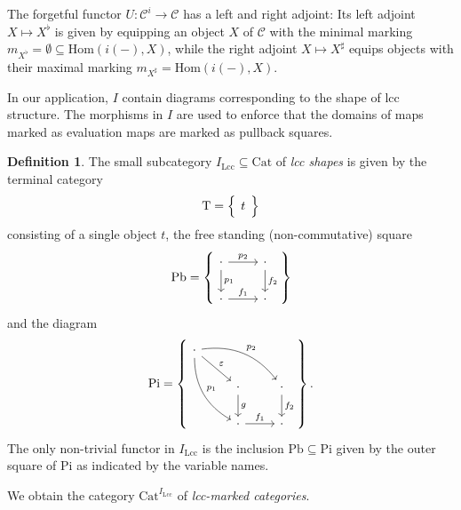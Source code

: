 \documentclass[a4paper]{article}
\theoremstyle{remark}
\theoremstyle{definition}
\newtheorem{definition}[theorem]{Definition}
\begin{document}
The forgetful functor $U : \mathcal{C}^i \rightarrow \mathcal{C}$ has a left and right adjoint:
Its left adjoint $X \mapsto X^\flat$ is given by equipping an object $X$ of $\mathcal{C}$ with the minimal marking $m_{X^\flat} = \emptyset \subseteq \mathrm{Hom}(i(-), X)$, while the right adjoint $X \mapsto X^\sharp$ equips objects with their maximal marking $m_{X^\sharp} = \mathrm{Hom}(i(-), X)$.

In our application, $I$ contain diagrams corresponding to the shape of lcc structure.
The morphisms in $I$ are used to enforce that the domains of maps marked as evaluation maps are marked as pullback squares.

\begin{definition}
  The small subcategory $I_\mathrm{Lcc} \subseteq \mathrm{Cat}$ of \emph{lcc shapes} is given by the terminal category 
  \begin{equation}
    \mathrm{T} =
    \left\{
      \begin{tikzcd}
        t
      \end{tikzcd}
    \right\}
  \end{equation}
  consisting of a single object $t$, the free standing (non-commutative) square
  \begin{equation}
    \mathrm{Pb} =
    \left\{
      \begin{tikzcd}
        \cdot \arrow[d, "p_1"] \arrow[r, "p_2"] & \cdot \arrow[d, "f_2"] \\
        \cdot \arrow[r, "f_1"] & \cdot
      \end{tikzcd}
    \right\}
  \end{equation}
  and the diagram
  \begin{equation}
    \mathrm{Pi} =
    \left\{
      \begin{tikzcd}
        \cdot \arrow[ddr, bend right, "p_1"] \arrow[drr, bend left, "p_2"] \arrow[dr, "\varepsilon"] \\
        & \cdot \arrow[d, "g"] & \cdot \arrow[d, "f_2"] \\
        & \cdot \arrow[r, "f_1"] & \cdot
      \end{tikzcd}
    \right\}.
  \end{equation}
  The only non-trivial functor in $I_\mathrm{Lcc}$ is the inclusion $\mathrm{Pb} \subseteq \mathrm{Pi}$ given by the outer square of $\mathrm{Pi}$ as indicated by the variable names.

  We obtain the category $\mathrm{Cat}^{I_\mathrm{Lcc}}$ of \emph{lcc-marked categories}.
\end{definition}
\end{document}
